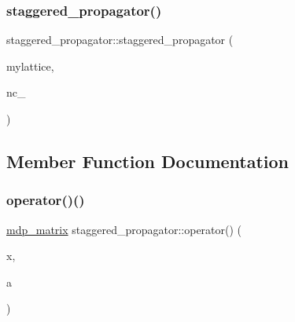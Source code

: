 \subsubsection{\texorpdfstring{staggered\+\_\+propagator()}{staggered\_propagator()}}
{\footnotesize\ttfamily staggered\+\_\+propagator\+::staggered\+\_\+propagator (\begin{DoxyParamCaption}\item[{\hyperlink{classmdp__lattice}{mdp\+\_\+lattice} \&}]{mylattice,  }\item[{int}]{nc\+\_\+ }\end{DoxyParamCaption})\hspace{0.3cm}{\ttfamily [inline]}}



\subsection{Member Function Documentation}
\mbox{\label{classstaggered__propagator_ae5c5d6720631c30938b09de4d3331e7f}} 
\subsubsection{\texorpdfstring{operator()()}{operator()()}\hspace{0.1cm}{\footnotesize\ttfamily [1/2]}}
{\footnotesize\ttfamily \hyperlink{classmdp__matrix}{mdp\+\_\+matrix} staggered\+\_\+propagator\+::operator() (\begin{DoxyParamCaption}\item[{\hyperlink{mdp__compatibility__macros_8h_aa6f1179c424e48adef1cedf7c436eb75}{site}}]{x,  }\item[{int}]{a }\end{DoxyParamCaption})\hspace{0.3cm}{\ttfamily [inline]}}

\mbox{\label{classstaggered__propagator_aed9bbdd906e6e68f806a895c5e1bd2d8}} 
